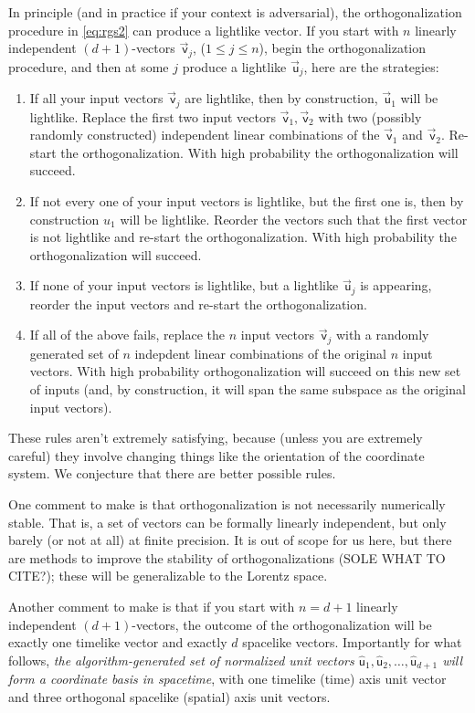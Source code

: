 \documentclass{article}
\newcommand\upvec[1]{\!\vec{\,\mathrm{#1}}}
\newcommand{\Lvec}[1]{\upvec{\mathsf{#1}}} %
\newcommand{\Lhat}[1]{\hat{\mathsf{#1}}} %
\newcommand{\plus}{\!+\!} %
\begin{document}
In principle (and in practice if your context is adversarial), the orthogonalization procedure in \eqref{eq:rgs2} can produce a lightlike vector.
If you start with $n$ linearly independent $(d\plus1)$-vectors $\Lvec{v}_j$, ($1\leq j\leq n$), begin the orthogonalization procedure, and then at some $j$ produce a lightlike $\Lvec{u}_j$, here are the strategies:
\begin{enumerate}
\item If all your input vectors $\Lvec{v}_j$ are lightlike, then by construction, $\Lvec{u}_1$ will be lightlike.
    Replace the first two input vectors $\Lvec{v}_1,\Lvec{v}_2$ with two (possibly randomly constructed) independent linear combinations of the $\Lvec{v}_1$ and $\Lvec{v}_2$.
    Re-start the orthogonalization.
    With high probability the orthogonalization will succeed.
    \item If not every one of your input vectors is lightlike, but the first one is, then by construction ${u}_1$ will be lightlike.
    Reorder the vectors such that the first vector is not lightlike and re-start the orthogonalization.
    With high probability the orthogonalization will succeed.
    \item If none of your input vectors is lightlike, but a lightlike $\Lvec{u}_j$ is appearing, reorder the input vectors and re-start the orthogonalization.
    \item If all of the above fails, replace the $n$ input vectors $\Lvec{v}_j$ with a randomly generated set of $n$ indepdent linear combinations of the original $n$ input vectors.
    With high probability orthogonalization will succeed on this new set of inputs (and, by construction, it will span the same subspace as the original input vectors).
\end{enumerate}
These rules aren't extremely satisfying, because (unless you are extremely careful) they involve changing things like the orientation of the coordinate system.
We conjecture that there are better possible rules.

One comment to make is that orthogonalization is not necessarily numerically stable.
That is, a set of vectors can be formally linearly independent, but only barely (or not at all) at finite precision.
It is out of scope for us here, but there are methods to improve the stability of orthogonalizations (SOLE WHAT TO CITE?); these will be generalizable to the Lorentz space.

Another comment to make is that if you start with $n=d+1$ linearly independent $(d\plus1)$-vectors, the outcome of the orthogonalization will be exactly one timelike vector and exactly $d$ spacelike vectors.
Importantly for what follows, \emph{the algorithm-generated set of normalized unit vectors $\Lhat{u}_1,\Lhat{u}_2,\ldots,\Lhat{u}_{d+1}$ will form a coordinate basis in spacetime}, with one timelike (time) axis unit vector and three orthogonal spacelike (spatial) axis unit vectors.
\end{document}
